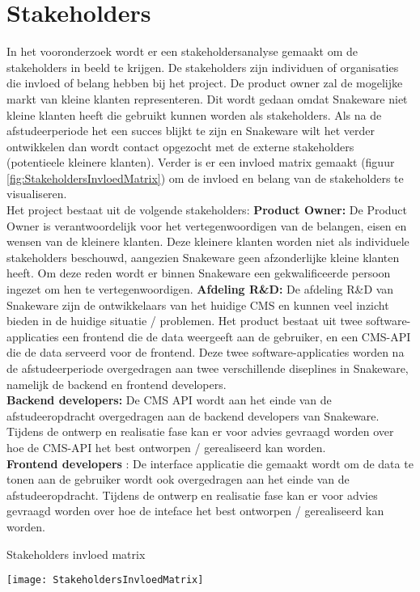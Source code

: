 \section{Stakeholders}
In het vooronderzoek wordt er een stakeholdersanalyse gemaakt om de stakeholders in beeld te krijgen.
De stakeholders zijn individuen of organisaties die invloed of belang hebben bij het project.
De product owner zal de mogelijke markt van kleine klanten representeren.
Dit wordt gedaan omdat Snakeware niet kleine klanten heeft die gebruikt kunnen worden als stakeholders.
Als na de afstudeerperiode het een succes blijkt te zijn en Snakeware wilt het verder ontwikkelen dan wordt contact opgezocht met de externe stakeholders (potentieele kleinere klanten). 
Verder is er een invloed matrix gemaakt (figuur \ref{fig:StakeholdersInvloedMatrix}) om de invloed en belang van de stakeholders te visualiseren. \\
Het project bestaat uit de volgende stakeholders:
\whitespace
\textbf{Product Owner:}
De Product Owner is verantwoordelijk voor het vertegenwoordigen van de belangen, eisen en wensen van de kleinere klanten.
Deze kleinere klanten worden niet als individuele stakeholders beschouwd, aangezien Snakeware geen afzonderlijke kleine klanten heeft.
Om deze reden wordt er binnen Snakeware een gekwalificeerde persoon ingezet om hen te vertegenwoordigen.
\whitespace
\textbf{Afdeling R\&D:} De afdeling R\&D van Snakeware zijn de ontwikkelaars van het huidige CMS en kunnen veel inzicht bieden in de huidige situatie / problemen.
\whitespace
Het product bestaat uit twee software-applicaties een frontend die de data weergeeft aan de gebruiker, en een CMS-API die de data serveerd voor de frontend.
Deze twee software-applicaties worden na de afstudeerperiode overgedragen aan twee verschillende diseplines in Snakeware, namelijk de backend en frontend developers.
\\
\textbf{Backend developers:} De CMS API wordt aan het einde van de afstudeeropdracht overgedragen aan de backend developers van Snakeware.
Tijdens de ontwerp en realisatie fase kan er voor advies gevraagd worden over hoe de CMS-API het best ontworpen / gerealiseerd kan worden. \\
\textbf{Frontend developers} : De interface applicatie die gemaakt wordt om de data te tonen aan de gebruiker wordt ook overgedragen aan het einde van de afstudeeropdracht.
Tijdens de ontwerp en realisatie fase kan er voor advies gevraagd worden over hoe de inteface het best ontworpen / gerealiseerd kan worden.
\begin{graphic}
    \captionsetup{type=figure}
    \caption{Stakeholders invloed matrix}
    \texttt{[image: StakeholdersInvloedMatrix]}
    \label{fig:StakeholdersInvloedMatrix}
\end{graphic}

